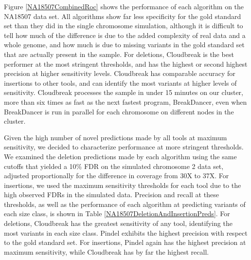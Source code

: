 \documentclass{bioinfo}
\begin{document}
Figure \ref{NA18507CombinedRoc} shows the performance of each algorithm on the NA18507 data set. All algorithms show far less specificity for the gold standard set than they did in the single chromosome simulation, although it is difficult to tell how much of the difference is due to the added complexity of real data and a whole genome, and how much is due to missing variants in the gold standard set that are actually present in the sample. For deletions, Cloudbreak is the best performer at the most stringent thresholds, and has the highest or second highest precision at higher sensitivity levels. Cloudbreak has comparable accuracy for insertions to other tools, and can identify the most variants at higher levels of sensitivity. Cloudbreak processes the sample in under 15 minutes on our cluster, more than six times as fast as the next fastest program, BreakDancer, even when BreakDancer is run in parallel for each chromosome on different nodes in the cluster.

Given the high number of novel predictions made by all tools at maximum sensitivity, we decided to characterize performance at more stringent thresholds. We examined the deletion predictions made by each algorithm using the same cutoffs that yielded a 10\% FDR on the simulated chromosome 2 data set, adjusted proportionally for the difference in coverage from 30X to 37X. For insertions, we used the maximum sensitivity thresholds for each tool due to the high observed FDRs in the simulated data. Precision and recall at these thresholds, as well as the performance of each algorithm at predicting variants of each size class, is shown in Table \ref{NA18507DeletionAndInsertionPreds}. For deletions, Cloudbreak has the greatest sensitivity of any tool, identifying the most variants in each size class. Pindel exhibits the highest precision with respect to the gold standard set. For insertions, Pindel again has the highest precision at maximum sensitivity, while Cloudbreak has by far the highest recall.
\end{document}
